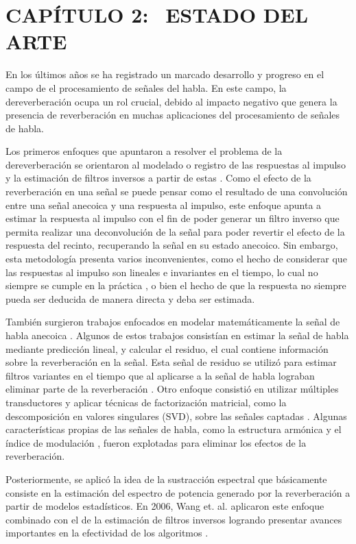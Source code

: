 \section[Estado del Arte]{CAPÍTULO 2:$\ \ \ \ $ESTADO DEL ARTE} 

En los últimos años se ha registrado un marcado desarrollo y progreso en el campo de el procesamiento de señales del habla. En este campo, la dereverberación ocupa un rol crucial, debido al impacto negativo que genera la presencia de reverberación en muchas aplicaciones del procesamiento de señales de habla. 

Los primeros enfoques que apuntaron a resolver el problema de la dereverberación se orientaron al modelado o registro de las respuestas al impulso y la estimación de filtros inversos a partir de estas \cite{filtros_inv}. Como el efecto de la reverberación en una señal se puede pensar como el resultado de una convolución entre una señal anecoica y una respuesta al impulso, este enfoque apunta a estimar la respuesta al impulso con el fin de poder generar un filtro inverso que permita realizar una deconvolución de la señal para poder revertir el efecto de la respuesta del recinto, recuperando la señal en su estado anecoico. Sin embargo, esta metodología presenta varios inconvenientes, como el hecho de considerar que las respuestas al impulso son lineales e invariantes en el tiempo, lo cual no siempre se cumple en la práctica \cite{LTI}, o bien el hecho de que la respuesta no siempre pueda ser deducida de manera directa y deba ser estimada. 


También surgieron trabajos enfocados en modelar matemáticamente la señal de habla anecoica  \cite{rabiner}. Algunos de estos trabajos consistían en estimar la señal de habla mediante predicción lineal, y calcular el residuo, el cual contiene información sobre la reverberación en la señal. Esta señal de residuo se utilizó para estimar filtros variantes en el tiempo que al aplicarse a la señal de habla lograban eliminar parte de la reverberación \cite{LPresiduo}. Otro enfoque consistió en utilizar múltiples transductores y aplicar técnicas de factorización matricial, como la descomposición en valores singulares (SVD), sobre las señales captadas \cite{multichannel}. Algunas características propias de las señales de habla, como la estructura armónica \cite{armonica} y el índice de modulación  \cite{mod}, fueron explotadas para eliminar los efectos de la reverberación. 

Posteriormente, se aplicó la idea de la sustracción espectral \cite{spect_subtrac} \cite{spect_subtrac2} que básicamente consiste en la estimación del espectro de potencia generado por la reverberación a partir de modelos estadísticos. En 2006, Wang et. al. aplicaron este enfoque combinado con el de la estimación de filtros inversos logrando presentar avances importantes en la efectividad de los algoritmos \cite{two_stage}.
 
